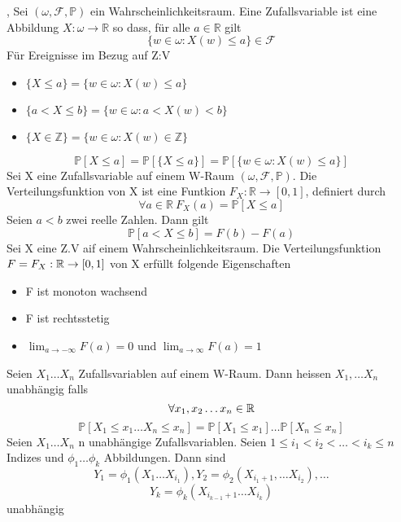 \sep
\Def[2.1 Zufallsvariable] \newline
Sei \( (\omega, \mathcal{F}, \mathbb{P})\) ein Wahrscheinlichkeitsraum. Eine Zufallsvariable ist eine Abbildung \( X : \omega \rightarrow \mathbb{R} \) so dass, für alle \( a \in \mathbb{R}\) gilt \[ \{ w \in \omega : X(w) \leq a \} \in \mathcal{F}\]
\Bem  \newline
Für Ereignisse im Bezug auf Z:V
\begin{itemize}
    \item \( \{X \leq a \} = \{ w \in \omega : X(w) \leq a\}\)
    \item \( \{ a < X \leq b \} = \{ w \in \omega : a < X(w) < b\}\)
    \item \( \{ X \in \mathbb{Z}\} = \{ w \in \omega : X(w) \in \mathbb{Z}\}\)
\end{itemize}
\[ \mathbb{P}[X \leq a] = \mathbb{P}[\{X \leq a\}] = \mathbb{P}[\{w \in \omega : X(w) \leq a\}]\]
\Def[2.2 Verteilungsfunktion] \newline
Sei X eine Zufallsvariable auf einem W-Raum \( (\omega, \mathcal{F}, \mathbb{P})\). Die Verteilungsfunktion von X ist eine Funtkion \(F_X : \mathbb{R} \rightarrow [0,1]\), definiert durch \[ \forall a \in \mathbb{R} \ F_X(a) = \mathbb{P}[X \leq a]\]
 \newline
Seien \(a < b\) zwei reelle Zahlen. Dann gilt \[ \mathbb{P}[a < X \leq b ] = F(b) - F(a)\]
 \newline
Sei X eine Z.V aif einem Wahrscheinlichkeitsraum. Die Verteilungsfunktion \( F = F_X : \mathbb{R} \rightarrow [0,1]\) von X erfüllt folgende Eigenschaften
\begin{itemize}
    \item F ist monoton wachsend
    \item F ist rechtsstetig
    \item \( \lim_{a \rightarrow -\infty} F(a) = 0 \) und \( \lim_{a \rightarrow \infty} F(a) = 1\)
\end{itemize}
\Def[2.5] \newline
Seien \( X_1 \dots X_n \) Zufallsvariablen auf einem W-Raum. Dann heissen \(X_1, \dots X_n \) unabhängig falls \[ \forall x_1, x_2 \dots x_n \in \mathbb{R} \] \[\mathbb{P}[X_1 \leq x_1 \dots X_n \leq x_n ] = \mathbb{P}[X_1 \leq x_1] \dots \mathbb{P}[X_n \leq x_n]\]
 \newline
Seien \(X_1 \dots X_n\) n unabhängige Zufallsvariablen. Seien \( 1 \leq i_1 < i_2 < \dots < i_k \leq n \) Indizes und \(\phi_1 \dots \phi_k\) Abbildungen. Dann sind  \[ Y_1 = \phi_1(X_1 \dots X_{i_1}), Y_2 = \phi_2(X_{i_{1}+1}, \dots X_{i_2}), \dots \] \[Y_k = \phi_k(X_{i_{k-1}+1} \dots X_{i_k})\] unabhängig \newline

